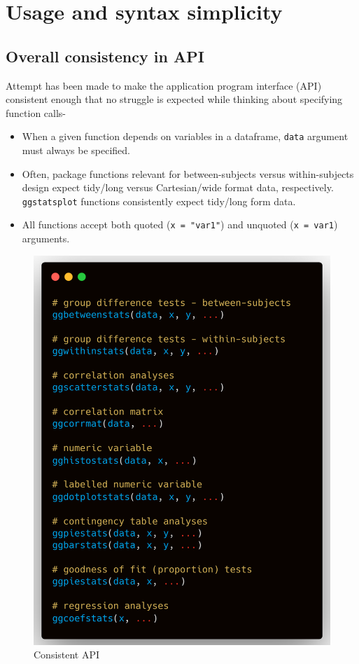 \documentclass[]{article}
\providecommand{\tightlist}{%
  \setlength{\itemsep}{0pt}\setlength{\parskip}{0pt}}
\begin{document}
\hypertarget{usage-and-syntax-simplicity}{%
\section{Usage and syntax
simplicity}\label{usage-and-syntax-simplicity}}

\hypertarget{overall-consistency-in-api}{%
\subsection{Overall consistency in
API}\label{overall-consistency-in-api}}

Attempt has been made to make the application program interface (API)
consistent enough that no struggle is expected while thinking about
specifying function calls-

\begin{itemize}
\tightlist
\item
  When a given function depends on variables in a dataframe,
  \texttt{data} argument must always be specified.
\item
  Often, package functions relevant for between-subjects versus
  within-subjects design expect tidy/long versus Cartesian/wide format
  data, respectively. \texttt{ggstatsplot} functions consistently expect
  tidy/long form data.
\item
  All functions accept both quoted (\texttt{x\ =\ "var1"}) and unquoted
  (\texttt{x\ =\ var1}) arguments.
\end{itemize}

\begin{figure}
\centering
\includegraphics{figures/arguments.png}
\caption{Consistent API}
\end{figure}
\end{document}
